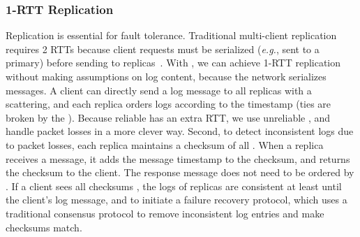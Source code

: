 \subsubsection{1-RTT Replication}
\label{sec:replication}


Replication is essential for fault tolerance.
Traditional multi-client replication requires 2 RTTs because client requests must be serialized (\textit{e.g.}, sent to a primary) before sending to replicas~\cite{park2019exploiting}.
With \sys{}, we can achieve 1-RTT replication without making assumptions on log content, because the network serializes messages.
A client can directly send a log message to all replicas with a scattering, and each replica orders logs according to the timestamp (ties are broken by the ).
Because reliable \sys{} has an extra RTT, we use unreliable \sys{}, and handle packet losses  in a more clever way.
Second, to detect inconsistent logs due to packet losses, each replica maintains a checksum of all .
When a replica receives a message, it adds the message timestamp to the checksum, and returns the checksum to the client. The response message does not need to be ordered by \sys{}.
If a client sees all checksums , the logs of replicas are consistent at least until the client's log message, and 
 to initiate a failure recovery protocol, which uses a traditional consensus protocol to remove inconsistent log entries and make checksums match.


